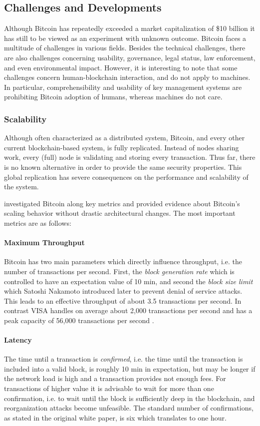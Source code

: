 \subsection{Challenges and Developments}
\label{sec:btc_challenges}

Although Bitcoin has repeatedly exceeded a market capitalization of \$10 billion it has still to be viewed as an experiment with unknown outcome. Bitcoin faces a multitude of challenges in various fields. Besides the technical challenges, there are also challenges concerning usability, governance, legal status, law enforcement, and even environmental impact. However, it is interesting to note that some challenges concern human-blockchain interaction, and do not apply to machines. In particular, comprehensibility and usability of key management systems are prohibiting Bitcoin adoption of humans, whereas machines do not care.

\subsubsection{Scalability}

Although often characterized as a distributed system, Bitcoin, and every other current blockchain-based system, is fully replicated. Instead of nodes sharing work, every (full) node is validating and storing every transaction. Thus far, there is no known alternative in order to provide the same security properties. This global replication has severe consequences on the performance and scalability of the system.

\cite{croman2016scaling} investigated Bitcoin along key metrics and provided evidence about Bitcoin's scaling behavior without drastic architectural changes.
The most important metrics are as follows:
\paragraph{Maximum Throughput} 
Bitcoin has two main parameters which directly influence throughput, i.e. the number of transactions per second. First, the \emph{block generation rate} which is controlled to have an expectation value of 10 min, and second the \emph{block size limit} which Satoshi Nakamoto introduced later to prevent denial of service attacks. This leads to an effective throughput of about 3.5 transactions per second. In contrast VISA handles on average about 2,000 transactions per second and has a peak capacity of 56,000 transactions per second \parencite{visa}. 
\paragraph{Latency} The time until a transaction is \emph{confirmed}, i.e. the time until the transaction is included into a valid block, is roughly 10 min in expectation, but may be longer if the network load is high and a transaction provides not enough fees. For transactions of higher value it is advisable to wait for more than one confirmation, i.e. to wait until the block is sufficiently deep in the blockchain, and reorganization attacks become unfeasible. The standard number of confirmations, as stated in the original white paper, is six which translates to one hour. 
